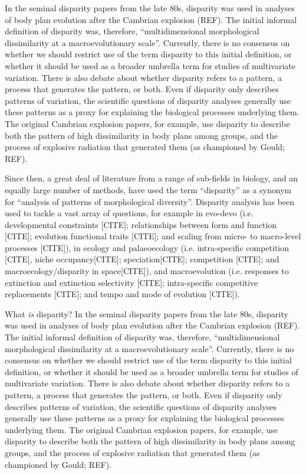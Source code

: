 \documentclass[12pt,letterpaper]{article}
\begin{document}
In the seminal disparity papers from the late 80s, disparity was used in analyses of body plan evolution after the Cambrian explosion (REF).
The initial informal definition of disparity was, therefore, ``multidimensional morphological dissimilarity at a macroevolutionary scale''.
Currently, there is no consensus on whether we should restrict use of the term disparity to this initial definition, or whether it should be used as a broader umbrella term for studies of multivariate variation. 
There is also debate about whether disparity refers to a pattern, a process that generates the pattern, or both. 
Even if disparity only describes patterns of variation, the scientific questions of disparity analyses generally use these patterns as a proxy for explaining the biological processes underlying them.
The original Cambrian explosion papers, for example, use disparity to describe both the pattern of high dissimilarity in body plans among groups, and the process of explosive radiation that generated them (as championed by Gould; REF). 


Since then, a great deal of literature from a range of sub-fields in biology, and an equally large number of methods, have used the term ``disparity'' as a synonym for ``analysis of patterns of morphological diversity''.
Disparity analysis has been used to tackle a vast array of questions, for example in evo-devo (i.e. developmental constraints [CITE]; relationships between form and function [CITE]; evolution functional traits [CITE]; and scaling from micro- to macro-level processes [CITE]), in ecology and palaeoecology (i.e. intra-specific competition [CITE], niche occupancy[CITE]; speciation[CITE]; competition [CITE]; and macroecology/disparity in space[CITE]), and macroevolution (i.e. responses to extinction and extinction selectivity [CITE]; intra-specific competitive replacements [CITE]; and tempo and mode of evolution [CITE]).

What \textit{is} disparity? In the seminal disparity papers from the late 80s, disparity was used in analyses of body plan evolution after the Cambrian explosion (REF).
The initial informal definition of disparity was, therefore, ``multidimensional morphological dissimilarity at a macroevolutionary scale''.
Currently, there is no consensus on whether we should restrict use of the term disparity to this initial definition, or whether it should be used as a broader umbrella term for studies of multivariate variation. 
There is also debate about whether disparity refers to a pattern, a process that generates the pattern, or both. 
Even if disparity only describes patterns of variation, the scientific questions of disparity analyses generally use these patterns as a proxy for explaining the biological processes underlying them.
The original Cambrian explosion papers, for example, use disparity to describe both the pattern of high dissimilarity in body plans among groups, and the process of explosive radiation that generated them (as championed by Gould; REF). 
\end{document}
